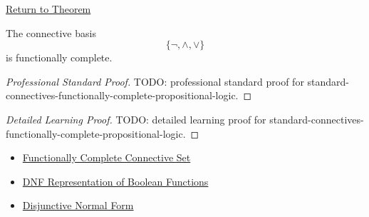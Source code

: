 \newpage
{}
\label{prf:standard-connectives-functionally-complete-propositional-logic}

\begin{remark*}[Return]
\hyperref[thm:standard-connectives-functionally-complete-propositional-logic]{Return to Theorem}
\end{remark*}

\begin{theorem*}
The connective basis
\[
\{\neg,\land,\lor\}
\]
is functionally complete.
\end{theorem*}

\begin{proof}[Professional Standard Proof]
\LRAProofBodyStart
TODO: professional standard proof for standard-connectives-functionally-complete-propositional-logic.
\end{proof}

\begin{proof}[Detailed Learning Proof]
\LRAProofBodyStart
TODO: detailed learning proof for standard-connectives-functionally-complete-propositional-logic.
\end{proof}

\begin{remark*}
\end{remark*}

\begin{dependencies}
\begin{itemize}
  \item \hyperref[def:functionally-complete-connective-set-propositional-logic]{Functionally Complete Connective Set}
  \item \hyperref[thm:dnf-representation-of-boolean-functions-propositional-logic]{DNF Representation of Boolean Functions}
  \item \hyperref[def:disjunctive-normal-form-propositional-logic]{Disjunctive Normal Form}
\end{itemize}
\end{dependencies}

\clearpage
